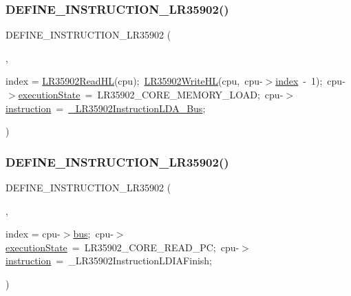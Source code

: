 \subsubsection{\texorpdfstring{D\+E\+F\+I\+N\+E\+\_\+\+I\+N\+S\+T\+R\+U\+C\+T\+I\+O\+N\+\_\+\+L\+R35902()}{DEFINE\_INSTRUCTION\_LR35902()}\hspace{0.1cm}{\footnotesize\ttfamily [17/20]}}
{\footnotesize\ttfamily D\+E\+F\+I\+N\+E\+\_\+\+I\+N\+S\+T\+R\+U\+C\+T\+I\+O\+N\+\_\+\+L\+R35902 (\begin{DoxyParamCaption}\item[{L\+D\+A\+\_\+\+D\+HL}]{,  }\item[{cpu-\/$>$}]{index = {\ttfamily \mbox{\hyperlink{isa-lr35902_8c_a2aecac31902540d73a813542994471ff}{L\+R35902\+Read\+HL}}(cpu);~\mbox{\hyperlink{isa-lr35902_8c_a4e59a8175a58c35aba094ac7bb13fddd}{L\+R35902\+Write\+HL}}(cpu,~cpu-\/$>$\mbox{\hyperlink{isa-lr35902_8c_ac9ee548085af12859cb52a6c757cf73a}{index}}~-\/~1);~cpu-\/$>$\mbox{\hyperlink{isa-lr35902_8c_a087a53d4d283226a73c530dd2883d634}{execution\+State}}~=~LR35902\+\_\+CORE\+\_\+MEMORY\+\_\+LOAD;~cpu-\/$>$\mbox{\hyperlink{isa-lr35902_8c_a516462a0e821c76277faaeb2a1364b35}{instruction}}~=~\mbox{\hyperlink{isa-lr35902_8c_af7d32b9936d0cef4c3331be122f32e13}{\+\_\+\+L\+R35902\+Instruction\+L\+D\+A\+\_\+\+Bus}};} }\end{DoxyParamCaption})}

\mbox{\label{isa-lr35902_8c_ac7e287a98044a18d712f48e07579bdb2}} 
\subsubsection{\texorpdfstring{D\+E\+F\+I\+N\+E\+\_\+\+I\+N\+S\+T\+R\+U\+C\+T\+I\+O\+N\+\_\+\+L\+R35902()}{DEFINE\_INSTRUCTION\_LR35902()}\hspace{0.1cm}{\footnotesize\ttfamily [18/20]}}
{\footnotesize\ttfamily D\+E\+F\+I\+N\+E\+\_\+\+I\+N\+S\+T\+R\+U\+C\+T\+I\+O\+N\+\_\+\+L\+R35902 (\begin{DoxyParamCaption}\item[{L\+D\+I\+A\+Delay}]{,  }\item[{cpu-\/$>$}]{index = {\ttfamily cpu-\/$>$\mbox{\hyperlink{isa-lr35902_8c_a6163e7e073b87ad067db0a3b10da6be9}{bus}};~cpu-\/$>$\mbox{\hyperlink{isa-lr35902_8c_a087a53d4d283226a73c530dd2883d634}{execution\+State}}~=~LR35902\+\_\+CORE\+\_\+READ\+\_\+PC;~cpu-\/$>$\mbox{\hyperlink{isa-lr35902_8c_a516462a0e821c76277faaeb2a1364b35}{instruction}}~=~\+\_\+LR35902InstructionLDIAFinish;} }\end{DoxyParamCaption})}

